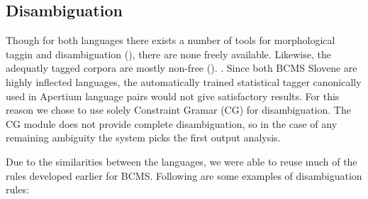 \subsection{Disambiguation}
Though for both languages there exists a number of tools for
morphological taggin and disambiguation (), there
are none freely available. Likewise, the adequatly tagged corpora are
mostly non-free (). .  Since both BCMS Slovene are
highly inflected languages, the automatically trained statistical
tagger canonically used in Apertium language pairs would not give
satisfactory results. For this reason we chose to use solely
Constraint Gramar (CG) for disambiguation. The CG module does not
provide complete disambiguation, so in the case of any remaining
ambiguity the system picks the first output analysis.

Due to the similarities between the languages, we were able to
reuse much of the rules developed earlier for BCMS. Following are
some examples of disambiguation rules:


